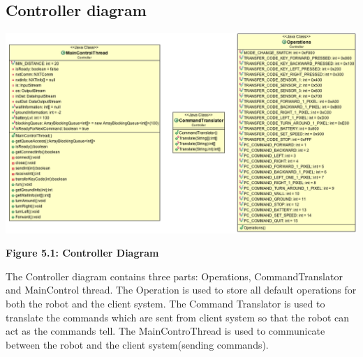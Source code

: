 \documentclass[11pt, a4paper]{report}
\begin{document}
\subsection{Controller diagram}
 \begin{center}
 \includegraphics[width=18.20cm]{Controller.png}
\end{center}
\begin{center}
\textbf {Figure 5.1: Controller Diagram} \\[0.3cm]
\end{center}
The Controller diagram contains three parts: Operations, CommandTranslator and MainControl thread. The Operation is used to store all default operations for both the robot and the client system. The Command Translator is used to translate the commands which are sent from client system so that the robot can act as the commands tell. The MainControThread is used to communicate between the robot and the client system(sending commands).
\pagebreak
\end{document}
